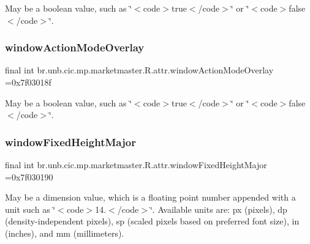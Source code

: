 May be a boolean value, such as \char`\"{}$<$code$>$true$<$/code$>$\char`\"{} or \char`\"{}$<$code$>$false$<$/code$>$\char`\"{}. \mbox{\label{classbr_1_1unb_1_1cic_1_1mp_1_1marketmaster_1_1R_1_1attr_a5bec7836ae9da6ef0d31f7106f8da772}} 
\subsubsection{\texorpdfstring{window\+Action\+Mode\+Overlay}{windowActionModeOverlay}}
{\footnotesize\ttfamily final int br.\+unb.\+cic.\+mp.\+marketmaster.\+R.\+attr.\+window\+Action\+Mode\+Overlay =0x7f03018f\hspace{0.3cm}{\ttfamily [static]}}

May be a boolean value, such as \char`\"{}$<$code$>$true$<$/code$>$\char`\"{} or \char`\"{}$<$code$>$false$<$/code$>$\char`\"{}. \mbox{\label{classbr_1_1unb_1_1cic_1_1mp_1_1marketmaster_1_1R_1_1attr_a6b4455df4964f70bcdf642dd7654900b}} 
\subsubsection{\texorpdfstring{window\+Fixed\+Height\+Major}{windowFixedHeightMajor}}
{\footnotesize\ttfamily final int br.\+unb.\+cic.\+mp.\+marketmaster.\+R.\+attr.\+window\+Fixed\+Height\+Major =0x7f030190\hspace{0.3cm}{\ttfamily [static]}}

May be a dimension value, which is a floating point number appended with a unit such as \char`\"{}$<$code$>$14.\+5sp$<$/code$>$\char`\"{}. Available units are\+: px (pixels), dp (density-\/independent pixels), sp (scaled pixels based on preferred font size), in (inches), and mm (millimeters). 

